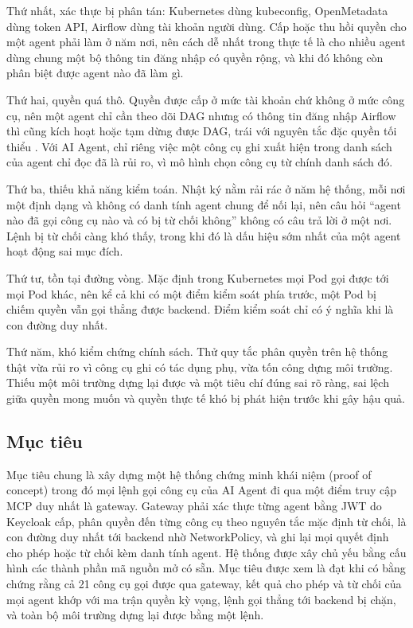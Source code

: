 \documentclass[a4paper]{article}
\begin{document}
Thứ nhất, xác thực bị phân tán: Kubernetes dùng kubeconfig, OpenMetadata dùng token API, Airflow dùng tài khoản người dùng. Cấp hoặc thu hồi quyền cho một agent phải làm ở năm nơi, nên cách dễ nhất trong thực tế là cho nhiều agent dùng chung một bộ thông tin đăng nhập có quyền rộng, và khi đó không còn phân biệt được agent nào đã làm gì.

Thứ hai, quyền quá thô. Quyền được cấp ở mức tài khoản chứ không ở mức công cụ, nên một agent chỉ cần theo dõi DAG nhưng có thông tin đăng nhập Airflow thì cũng kích hoạt hoặc tạm dừng được DAG, trái với nguyên tắc đặc quyền tối thiểu \parencite{saltzer1975protection}. Với AI Agent, chỉ riêng việc một công cụ ghi xuất hiện trong danh sách của agent chỉ đọc đã là rủi ro, vì mô hình chọn công cụ từ chính danh sách đó.

Thứ ba, thiếu khả năng kiểm toán. Nhật ký nằm rải rác ở năm hệ thống, mỗi nơi một định dạng và không có danh tính agent chung để nối lại, nên câu hỏi ``agent nào đã gọi công cụ nào và có bị từ chối không'' không có câu trả lời ở một nơi. Lệnh bị từ chối càng khó thấy, trong khi đó là dấu hiệu sớm nhất của một agent hoạt động sai mục đích.

Thứ tư, tồn tại đường vòng. Mặc định trong Kubernetes mọi Pod gọi được tới mọi Pod khác, nên kể cả khi có một điểm kiểm soát phía trước, một Pod bị chiếm quyền vẫn gọi thẳng được backend. Điểm kiểm soát chỉ có ý nghĩa khi là con đường duy nhất.

Thứ năm, khó kiểm chứng chính sách. Thử quy tắc phân quyền trên hệ thống thật vừa rủi ro vì công cụ ghi có tác dụng phụ, vừa tốn công dựng môi trường. Thiếu một môi trường dựng lại được và một tiêu chí đúng sai rõ ràng, sai lệch giữa quyền mong muốn và quyền thực tế khó bị phát hiện trước khi gây hậu quả.

\subsection{Mục tiêu}

Mục tiêu chung là xây dựng một hệ thống chứng minh khái niệm (proof of concept) trong đó mọi lệnh gọi công cụ của AI Agent đi qua một điểm truy cập MCP duy nhất là gateway. Gateway phải xác thực từng agent bằng JWT do Keycloak cấp, phân quyền đến từng công cụ theo nguyên tắc mặc định từ chối, là con đường duy nhất tới backend nhờ NetworkPolicy, và ghi lại mọi quyết định cho phép hoặc từ chối kèm danh tính agent. Hệ thống được xây chủ yếu bằng cấu hình các thành phần mã nguồn mở có sẵn. Mục tiêu được xem là đạt khi có bằng chứng rằng cả 21 công cụ gọi được qua gateway, kết quả cho phép và từ chối của mọi agent khớp với ma trận quyền kỳ vọng, lệnh gọi thẳng tới backend bị chặn, và toàn bộ môi trường dựng lại được bằng một lệnh.
\end{document}
